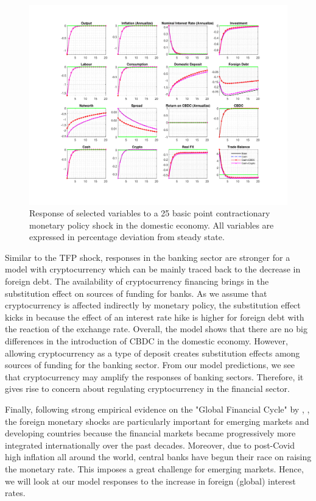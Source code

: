 \documentclass[12pt, a4paper]{article}
\begin{document}
\begin{figure}[H]
  \hspace{-0.7cm}
	\centering
	\centerline{\includegraphics[trim = 0mm 23mm 0mm 18mm, clip, scale=0.97]{monetary_cashvs.pdf}}
	\caption{Response of selected variables to a 25 basic point contractionary monetary policy shock in the domestic economy. All variables are expressed in percentage deviation from steady state.}
	\label{money}
\end{figure}


Similar to the TFP shock, responses in the banking sector are stronger for a model with cryptocurrency which can be mainly traced back to the decrease in foreign debt. The availability of cryptocurrency financing brings in the substitution effect on sources of funding for banks. As we assume that cryptocurrency is affected indirectly by monetary policy, the substitution effect kicks in because the effect of an interest rate hike is higher for foreign debt with the reaction of the exchange rate. Overall, the model shows that there are no big differences in the introduction of CBDC in the domestic economy. However, allowing cryptocurrency as a type of deposit creates substitution effects among sources of funding for the banking sector. From our model predictions, we see that cryptocurrency may amplify the responses of banking sectors. Therefore, it gives rise to concern about regulating cryptocurrency in the financial sector.

Finally, following strong empirical evidence on the "Global Financial Cycle" by \cite{miranda2020us}, \cite{miranda2020global}, the foreign monetary shocks are particularly important for emerging markets and developing countries because the financial markets became progressively more integrated internationally over the past decades. Moreover, due to post-Covid high inflation all around the world, central banks have begun their race on raising the monetary rate. This imposes a great challenge for emerging markets. Hence, we will look at our model responses to the increase in foreign (global) interest rates.
\end{document}
